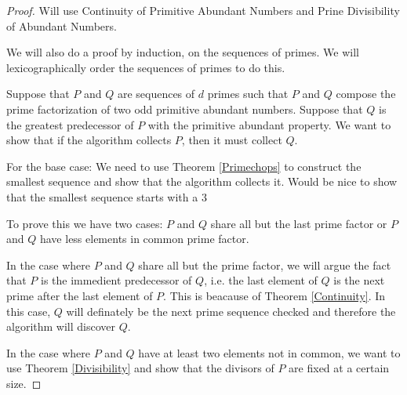 \documentclass[../paper.tex]{subfiles}
\begin{document}
\begin{proof}
Will use Continuity of Primitive Abundant Numbers and Prine
Divisibility of Abundant Numbers.

We will also do a proof by induction, on the sequences of primes.
We will lexicographically order the sequences of primes to do
this.

Suppose that $P$ and $Q$ are sequences of $d$ primes such that $P$
and $Q$ compose the prime factorization of two odd primitive
abundant numbers. Suppose that $Q$ is the greatest predecessor of
$P$ with the primitive abundant property. We want to show that if
the algorithm collects $P$, then it must collect $Q$. 

For the base case: We need to use Theorem {\ref{Primechops}} to
construct the smallest sequence and show that the algorithm
collects it. Would be nice to show that the smallest sequence
starts with a $3$

To prove this we have two cases: $P$ and $Q$ share all but the
last prime factor or $P$ and $Q$ have less elements in common
prime factor.

In the case where $P$ and $Q$ share all but the prime factor, we
will argue the fact that $P$ is the immedient predecessor of $Q$,
i.e. the last element of $Q$ is the next prime after the last
element of $P$. This is beacause of Theorem {\ref{Continuity}}. In
this case, $Q$ will definately be the next prime sequence checked
and therefore the algorithm will discover $Q$.

In the case where $P$ and $Q$ have at least two elements not in
common, we want to use Theorem {\ref{Divisibility}} and show that
the divisors of $P$ are fixed at a certain size.

\end{proof}
\end{document}
